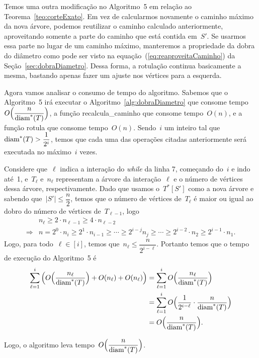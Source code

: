 
		Temos uma outra modificação no 
		Algoritmo~5   
		em relação ao Teorema~\ref{teo:corteExato}.
		Em vez de calcularmos novamente o caminho máximo da nova
		árvore, podemos reutilizar o caminho calculado anteriormente,
		aproveitando somente a parte do caminho que está contida 
		em~$S'$. 
		Se usarmos essa parte no lugar de um caminho máximo,
		manteremos a propriedade da dobra do diâmetro como pode
		ser visto na equação~(\ref{eq:reaproveitaCaminho}) da 
		Seção~\ref{sec:dobraDiametro}. 
		Dessa forma, a rotulação continua basicamente a mesma,
		bastando apenas fazer um ajuste nos vértices para a esquerda.

		\bigskip

		Agora vamos analisar o consumo de tempo do algoritmo.
		Sabemos que o Algoritmo~5 
		irá executar
		o Algoritmo~\ref{alg:dobraDiametro} que consome 
		tempo ~${O\Big(\dfrac{n}{\mathrm{diam}^*(T)}\Big)}$, a função
		{\sc recalcula\_caminho} que consome tempo~$O(n)$, e a função
		{\sc rotula} que consome tempo~$O(n)$.
		Sendo~$i$ um inteiro tal que~$\mathrm{diam}^*(T)>\dfrac{1}{2^i}$, 
		temos que cada uma das operações citadas anteriormente
		será executada no máximo~$i$ vezes.

		Considere que~$\ell$ indica a interação do \textit{while}
		da linha 7,
		começando do~$i$ e indo até~1, e~$T_\ell$ e~$n_\ell$ 
		representam a árvore da interação~$\ell$ e
		o número de vértices dessa árvore, respectivamente.
		Dado que usamos o~$T^*[S']$ como a nova árvore
		e sabendo que~$|S'|\le \dfrac{n}{2}$,
		temos que o número de vértices de~$T_{\ell}$
		é maior ou igual ao 
		dobro do número de vértices de~$T_{\ell-1}$, logo
		\begin{align}
			 & n_{\ell} \ge 2\cdot n_{\ell-1} \ge 4\cdot n_{\ell-2} \nonumber\\
			\Rightarrow & n = 2^0\cdot n_i\ge 2^1\cdot n_{i-1} \ge\cdots\ge
			2^{i-j}n_j\ge\cdots\ge
			 2^{i-2}\cdot n_{2}\ge 2^{i-1}\cdot n_1. \nonumber 
		\end{align}
		Logo, para todo~$\ell\in[i]$, temos que~$n_\ell \le\dfrac{n} {2^{i-\ell}}$.
		Portanto temos que o tempo de execução do Algoritmo~5 é
		\begin{align}
			\displaystyle\sum_{\ell=1}^{i} \Big(O\Big(\dfrac{n_\ell}{\mathrm{diam}^*(T)}\Big)
			+ O(n_\ell) + O(n_\ell)\Big)
			&= \displaystyle\sum_{\ell=1}^{i} O\Big(\dfrac{n_\ell}{\mathrm{diam}^*(T)}\Big) \nonumber\\
			&= \displaystyle\sum_{\ell=1}^{i} O\Big(\dfrac{1}{2^{i-\ell}}
			\cdot\dfrac{n}{\mathrm{diam}^*(T)}\Big) \nonumber\\
			&= O\Big(\dfrac{n}{\mathrm{diam}^*(T)}\Big). \nonumber
		\end{align}

		Logo, o algoritmo leva tempo~$O\Big(\dfrac{n}{\mathrm{diam}^*(T)}\Big)$.
